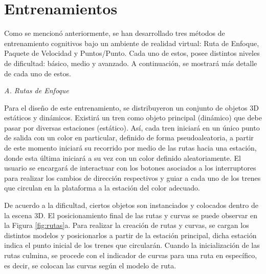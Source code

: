 \documentclass[conference]{IEEEtran}
\begin{document}

\section{Entrenamientos} \label{training}

Como se mencionó anteriormente, se han desarrollado tres métodos de entrenamiento cognitivos bajo un ambiente de realidad virtual: Ruta de Enfoque, Paquete de Velocidad y Puntos/Punto. Cada uno de estos, posee distintos niveles de dificultad: básico, medio y avanzado. A continuación, se mostrará más detalle de cada uno de estos.
\bigskip

\textit{A. Rutas de Enfoque}
\medskip

Para el diseño de este entrenamiento, se distribuyeron un conjunto de objetos 3D estáticos y dinámicos. Existirá un tren como objeto principal (dinámico) que debe pasar por diversas estaciones (estático). Así, cada tren iniciará en un único punto de salida con un color en particular, definido de forma pseudoaleatoria, a partir de este momento iniciará su recorrido por medio de las rutas hacia una estación, donde esta última iniciará a su vez con un color definido aleatoriamente. El usuario se encargará de interactuar con los botones asociados a los interruptores para realizar los cambios de dirección respectivos y guiar a cada uno de los trenes que circulan en la plataforma a la estación del color adecuado. 

De acuerdo a la dificultad, ciertos objetos son instanciados y colocados dentro de la escena 3D.  El posicionamiento final de las rutas y curvas se puede observar en la Figura \ref{fig:rutas}a. Para realizar la creación de rutas y curvas, se cargan los distintos modelos y posicionarlos a partir de la estación principal, dicha estación indica el punto inicial de los trenes que circularán. Cuando la inicialización de las rutas culmina, se procede con el indicador de curvas para una ruta en específico, es decir, se colocan las curvas según el modelo de ruta.

\end{document}
